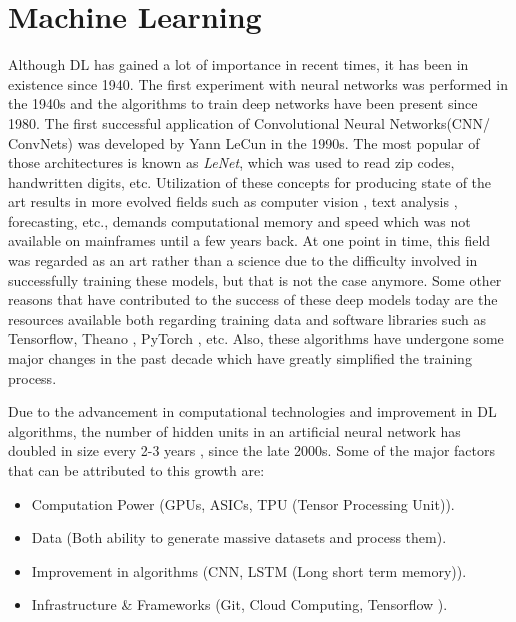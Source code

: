 \section{Machine Learning}

Although DL has gained a lot of importance in recent times, it has been in existence since 1940. The first experiment with neural networks was performed in the 1940s \parencite{mcculloch1943logical} and the algorithms to train deep networks have been present since 1980. The first successful application of Convolutional Neural Networks(CNN/ ConvNets) was developed by Yann LeCun \parencite{lecun1998gradient} in the 1990s. The most popular of those architectures is known as \textit{LeNet}, which was used to read zip codes, handwritten digits, etc. Utilization of these concepts for producing state of the art results in more evolved fields such as computer vision \parencite{he2015delving}, text analysis \parencite{devlin2018bert}, forecasting, etc., demands computational memory and speed which was not available on mainframes until a few years back. At one point in time, this field was regarded as an art rather than a science due to the difficulty involved in successfully training these models, but that is not the case anymore. Some other reasons that have contributed to the success of these deep models today are the resources available both regarding training data and software libraries such as Tensorflow\parencite{tensorflow2015-whitepaper}, Theano \parencite{theano}, PyTorch \parencite{paszke2017automatic_pytorch}, etc. Also, these algorithms have undergone some major changes in the past decade which have greatly simplified the training process. 

Due to the advancement in computational technologies and improvement in DL algorithms\parencite{hinton2006fast, bengio2007scaling, delalleau2011shallow}, the number of hidden units in an artificial neural network has doubled in size every 2-3 years \parencite{goodfellow2016deep}, since the late 2000s. Some of the major factors that can be attributed to this growth are:

\begin{itemize}
    \item Computation Power (GPUs, ASICs, TPU (Tensor Processing Unit)).
    \item Data (Both ability to generate massive datasets and process them).
    \item Improvement in algorithms (CNN, LSTM (Long short term memory)).
    \item Infrastructure \& Frameworks (Git, Cloud Computing, Tensorflow \parencite{tensorflow2015-whitepaper}).
\end{itemize}


